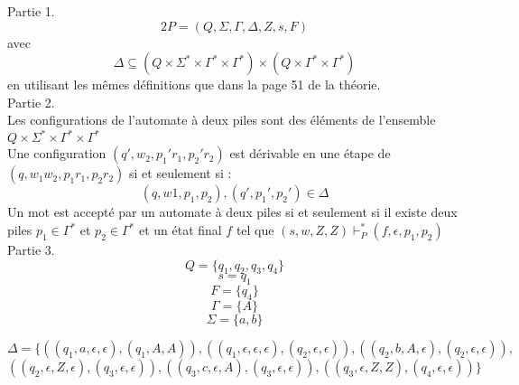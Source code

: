 \documentclass[12pt,french,a4paper]{article}
\begin{document}
\begin{question}
Partie 1.
$$2P=(Q,\Sigma,\Gamma,\Delta,Z,s,F)$$
avec $$\Delta \subseteq (Q\times \Sigma^* \times \Gamma^* \times \Gamma^*)\times(Q\times \Gamma^* \times \Gamma^*)$$
en utilisant les mêmes définitions que dans la page 51 de la théorie.\\

Partie 2.\\
Les configurations de l'automate à deux piles sont des éléments de l'ensemble $Q\times \Sigma^* \times \Gamma^* \times \Gamma^*$\\
Une configuration $(q',w_2,p_1'r_1,p_2'r_2)$ est dérivable en une étape de $(q,w_1 w_2,p_1 r_1,p_2 r_2)$ si et seulement si :
$$(q,w1,p_1,p_2),(q',p_1',p_2')\in \Delta$$
Un mot est accepté par un automate à deux piles si et seulement si il existe deux piles $p_1\in \Gamma^*$ et $p_2\in \Gamma^*$ et un état final $f$ tel que $(s,w,Z,Z)\vdash_P^*(f,\epsilon,p_1,p_2)$\\

Partie 3.\\
$$Q=\{q_1,q_2,q_3,q_4\}$$
$$s=q_1$$
$$F=\{q_4\}$$
$$\Gamma=\{A\}$$
$$\Sigma=\{a,b\}$$

$$\Delta=\{((q_1,a,\epsilon,\epsilon),(q_1,A,A)), ((q_1,\epsilon,\epsilon,\epsilon),(q_2,\epsilon,\epsilon)), ((q_2,b,A,\epsilon),(q_2,\epsilon,\epsilon)),$$
$$((q_2,\epsilon,Z,\epsilon),(q_3,\epsilon,\epsilon)), ((q_3,c,\epsilon,A),(q_3,\epsilon,\epsilon)), ((q_3,\epsilon,Z,Z),(q_4,\epsilon,\epsilon))\}$$ 

\end{question}
\end{document}
